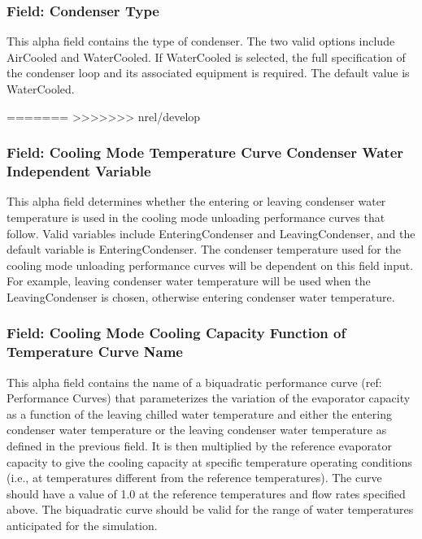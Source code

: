 \subsubsection{Field: Condenser Type}\label{field-condenser-type-7}

This alpha field contains the type of condenser.  The two valid options include AirCooled and WaterCooled. If WaterCooled is selected, the full specification of the condenser loop and its associated equipment is required. The default value is WaterCooled.

=======
>>>>>>> nrel/develop
\subsubsection{Field: Cooling Mode Temperature Curve Condenser Water Independent Variable}\label{field-cooling-mode-temperature-curve-condenser-water-independent-variable}

This alpha field determines whether the entering or leaving condenser water temperature is used in the cooling mode unloading performance curves that follow. Valid variables include EnteringCondenser and LeavingCondenser, and the default variable is EnteringCondenser. The condenser temperature used for the cooling mode unloading performance curves will be dependent on this field input. For example, leaving condenser water temperature will be used when the LeavingCondenser is chosen, otherwise entering condenser water temperature.

\subsubsection{Field: Cooling Mode Cooling Capacity Function of Temperature Curve Name}\label{field-cooling-mode-cooling-capacity-function-of-temperature-curve-name}

This alpha field contains the name of a biquadratic performance curve (ref: Performance Curves) that parameterizes the variation of the evaporator capacity as a function of the leaving chilled water temperature and either the entering condenser water temperature or the leaving condenser water temperature as defined in the previous field. It is then multiplied by the reference evaporator capacity to give the cooling capacity at specific temperature operating conditions (i.e., at temperatures different from the reference temperatures). The curve should have a value of 1.0 at the reference temperatures and flow rates specified above. The biquadratic curve should be valid for the range of water temperatures anticipated for the simulation.

